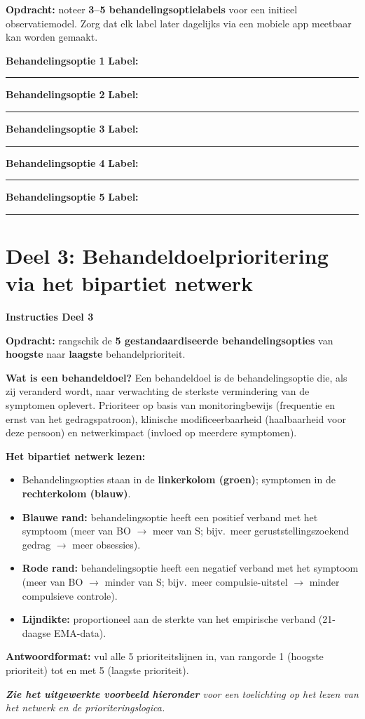 \documentclass[11pt,a4paper]{article}
\newcommand{\behandelingsoptieslot}[1]{%
\vspace{0.25em}\noindent
\begin{tcolorbox}[colback=SoftBG,colframe=BorderGrey,boxrule=0.4pt,arc=1.5mm,left=8pt,right=8pt,top=5pt,bottom=5pt]%
\small\textbf{\color{SlateMid}Behandelingsoptie #1}\hspace{1em}%
\textbf{Label:}\hspace{0.5em}\rule{0.56\linewidth}{0.25pt}%
\end{tcolorbox}%
}
\begin{document}
\begin{responsebox}
\small\textbf{Opdracht:} noteer \textbf{3--5 behandelingsoptielabels} voor een initieel observatiemodel.
Zorg dat elk label later dagelijks via een mobiele app meetbaar kan worden gemaakt.

\behandelingsoptieslot{1}
\behandelingsoptieslot{2}
\behandelingsoptieslot{3}
\behandelingsoptieslot{4}
\behandelingsoptieslot{5}
\end{responsebox}

\vspace{0.6em}
\newpage


\section{Deel 3: Behandeldoelprioritering via het bipartiet netwerk}

\begin{tcolorbox}[colback=yellow!5,colframe=GoldAmber,arc=2.5mm,boxrule=0.9pt,
  left=10pt,right=10pt,top=9pt,bottom=9pt]
\textbf{\color{GoldAmber}Instructies Deel 3}

\smallskip\small
\textbf{Opdracht:} rangschik de \textbf{5 gestandaardiseerde behandelingsopties} van
\textbf{hoogste} naar \textbf{laagste} behandelprioriteit.

\textbf{Wat is een behandeldoel?}
Een behandeldoel is de behandelingsoptie die, als zij veranderd wordt, naar verwachting de
sterkste vermindering van de symptomen oplevert. Prioriteer op basis van monitoringbewijs
(frequentie en ernst van het gedragspatroon), klinische modificeerbaarheid
(haalbaarheid voor deze persoon) en netwerkimpact (invloed op meerdere symptomen).

\textbf{Het bipartiet netwerk lezen:}
\begin{itemize}[topsep=2pt,itemsep=1pt]
\item Behandelingsopties staan in de \textbf{linkerkolom (groen)}; symptomen in de \textbf{rechterkolom (blauw)}.
\item \textbf{Blauwe rand:} behandelingsoptie heeft een positief verband met het symptoom
(meer van BO $\rightarrow$ meer van S; bijv.\ meer geruststellingszoekend gedrag $\rightarrow$ meer obsessies).
\item \textbf{Rode rand:} behandelingsoptie heeft een negatief verband met het symptoom
(meer van BO $\rightarrow$ minder van S; bijv.\ meer compulsie-uitstel $\rightarrow$ minder compulsieve controle).
\item \textbf{Lijndikte:} proportioneel aan de sterkte van het empirische verband
(21-daagse EMA-data).
\end{itemize}

\textbf{Antwoordformat:} vul alle 5 prioriteitslijnen in, van rangorde 1 (hoogste prioriteit)
tot en met 5 (laagste prioriteit).

\medskip
\textit{\textbf{Zie het uitgewerkte voorbeeld hieronder} voor een toelichting op het lezen van het netwerk en de prioriteringslogica.}
\end{tcolorbox}
\end{document}
